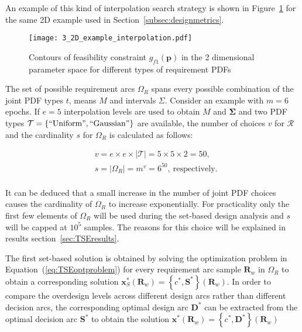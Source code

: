 An example of this kind of interpolation search strategy is shown in Figure~\ref{fig:2Dexampleinterp} for the same 2D example used in Section~\ref{subsec:designmetrics}.

\begin{figure}[h!]
	\centering
	\texttt{[image: 3\_2D\_example\_interpolation.pdf]}
	\caption{Contours of feasibility constraint $g_{f1}(\mathbf{p})$ in the 2 dimensional parameter space for different types of requirement \acp{PDF}}
	\label{fig:2Dexampleinterp}
\end{figure}

The set of possible requirement arcs $\Omega_R$ spans every possible combination of the joint \ac{PDF} types $t$, means $M$ and intervals $\Sigma$. Consider an example with $m=6$ epochs. If $e=5$ interpolation levels are used to obtain $M$ and $\boldsymbol{\Sigma}$ and two \ac{PDF} types $\mathcal{T} = \left\{\mathrm{``Uniform"},\mathrm{``Gaussian"}\right\}$ are available, the number of choices $v$ for $\mathcal{R}$ and the cardinality $s$ for $\Omega_R$ is calculated as follows:

\begin{equation*}
	\begin{aligned}
		& v = e \times e \times |\mathcal{T}| = 5 \times 5 \times 2 = 50,\\
		& s = |\Omega_R| = m^v = 6^{50},~\mathrm{respectively}.\\
	\end{aligned}
\end{equation*}

It can be deduced that a small increase in the number of joint \ac{PDF} choices causes the cardinality of $\Omega_R$ to increase exponentially. For practicality only the first few elements of $\Omega_R$ will be used during the set-based design analysis and $s$ will be capped at $10^5$ samples. The reasons for this choice will be explained in results section~\ref{sec:TSEresults}.

The first set-based solution is obtained by solving the optimization problem in Equation~(\ref{eq:TSEoptproblem}) for every requirement arc sample $\mathbf{R}_w$ in $\Omega_R$ to obtain a corresponding solution $\mathbf{x}_S^*(\mathbf{R}_w) = \left\{c^*,\mathbf{S}^*\right\}(\mathbf{R}_w)$. In order to compare the overdesign levels across different design arcs rather than different decision arcs, the corresponding optimal design arc $\mathbf{D}^*$ can be extracted from the optimal decision arc $\mathbf{S}^*$ to obtain the solution $\mathbf{x}^*(\mathbf{R}_w) = \left\{c^*,\mathbf{D}^*\right\}(\mathbf{R}_w)$

